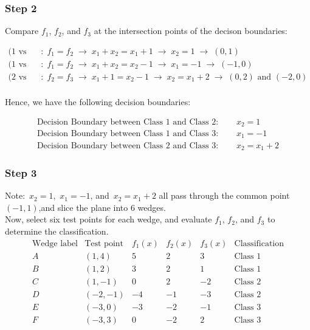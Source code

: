 \documentclass{article}
\begin{document}
\subsubsection*{Step 2}
\parbox{\textwidth}{
Compare $f_{1}$, $f_{2}$, and $f_{3}$ at the intersection points of the decison boundaries:

\begin{center}
$$
\begin{aligned}
\text{(1 vs 2)} &: \; f_{1}=f_{2} \;\rightarrow\; x_{1}+x_{2} = x_1 + 1 \;\rightarrow\; x_{2} = 1 \;\rightarrow\; (0,1)\\
\text{(1 vs 3)} &: \; f_{1}=f_{2} \;\rightarrow\; x_{1}+x_{2} = x_2 - 1 \;\rightarrow\; x_{1} = -1 \;\rightarrow\; (-1,0) \\
\text{(2 vs 3)} &: \; f_{2}=f_{3} \;\rightarrow\; x_{1}+1 = x_{2}-1 \;\rightarrow\; x_{2} = x_{1}+2 \;\rightarrow\; (0,2) \text{ and }  (-2,0)\\
\end{aligned}
$$
\end{center}

Hence, we have the following decision boundaries:
\begin{center}
$$
\begin{aligned}
\text{Decision Boundary between Class 1 and Class 2: }& \quad x_{2}=1 \\
\text{Decision Boundary between Class 1 and Class 3: }& \quad x_{1}=-1 \\
\text{Decision Boundary between Class 2 and Class 3: }& \quad x_{2}=x_{1}+2 
\end{aligned}
$$
\end{center}
}

\subsubsection*{Step 3}
\parbox{\textwidth}{
Note: \,$x_{2}=1$, \,$x_{1}=-1$, and \,$x_{2}=x_{1}+2$ all pass
through the common point $(-1,1)$,and slice the plane into 6 wedges.\\

Now, select six test points for each wedge, and evaluate $f_1$, $f_2$, and $f_3$ to determine the classification.\\

$$
\begin{array}{c|c|c|c|c|c}
\text{Wedge label} & \text{Test point} & f_{1}(x) & f_{2}(x) & f_{3}(x) & \text{Classification}\\ \hline
A & ( 1, 4)  &  5 &  2 &  3 & \text{Class 1}\\ %
B & ( 1, 2)  &  3 &  2 &  1 & \text{Class 1} \\ %
C & ( 1, -1) &  0 &  2 & -2 & \text{Class 2}\\ %
D & (-2,-1)  & -4 & -1 & -3 & \text{Class 2}\\ %
E & (-3, 0)  & -3 & -2 & -1 & \text{Class 3}\\ %
F & (-3, 3)  &  0 & -2 &  2 & \text{Class 3}\\ %
\end{array}
$$

}
\end{document}
